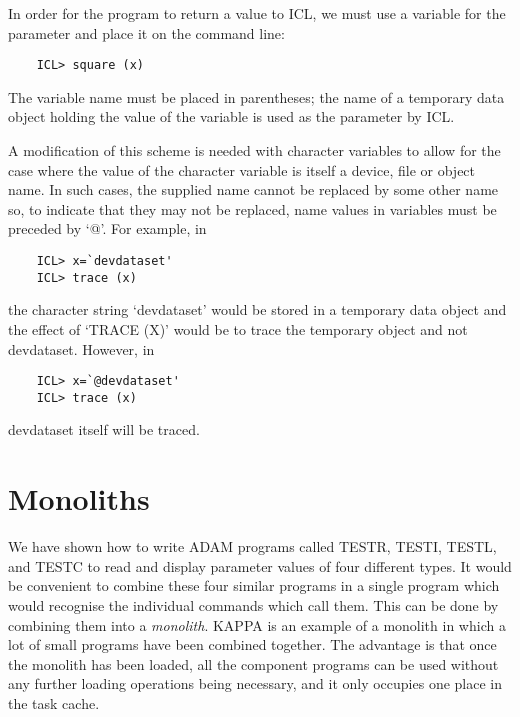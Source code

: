 In order for the program to return a value to ICL, we must use a variable for
the parameter and place it on the command line:

\begin{small}
\begin{verbatim}
    ICL> square (x)
\end{verbatim}
\end{small}

The variable name must be placed in parentheses; the name of a temporary
data object holding the value of the variable is used as the parameter by ICL.

A modification of this scheme is needed with character variables to allow for
the case where the value of the character variable is itself a device, file
or object name. 
In such cases, the supplied name cannot be replaced by some other name so, 
to indicate that they may not be replaced, name values in variables must be 
preceded by `@'.
For example, in

\begin{small}
\begin{verbatim}
    ICL> x=`devdataset'
    ICL> trace (x)
\end{verbatim}
\end{small}

the character string `devdataset' would be stored in a temporary data object
and the effect of `TRACE (X)' would be to trace the temporary object and not
devdataset.
However, in

\begin{small}
\begin{verbatim}
    ICL> x=`@devdataset'
    ICL> trace (x)
\end{verbatim}
\end{small}

devdataset itself will be traced.

\section{Monoliths}
\label{S_Mono}

We have shown how to write ADAM programs called TESTR, TESTI, TESTL, and TESTC
to read and display parameter values of four different types.
It would be convenient to combine these four similar programs in a single
program which would recognise the individual commands which call them.
This can be done by combining them into a {\em monolith}.
KAPPA is an example of a monolith in which a lot of small programs have been
combined together.
The advantage is that once the monolith has been loaded, all the component
programs can be used without any further loading operations being necessary,
and it only occupies one place in the task cache.

